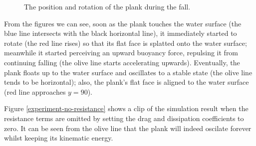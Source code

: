 \begin{figure}[h]
	\centering
	\caption{The position and rotation of the plank during the fall.}
	\label{simulation-result}
\end{figure}

From the figures we can see, soon as the plank touches the water surface (the blue line intersects with the black horizontal line), it immediately started to rotate (the red line rises) so that its flat face is splatted onto the water surface;
meanwhile it started perceiving an upward buoyancy force, repulsing it from continuing falling (the olive line starts accelerating upwards).
Eventually, the plank floats up to the water surface and oscillates to a stable state (the olive line tends to be horizontal);
also, the plank's flat face is aligned to the water surface (red line approaches $y=90$).

Figure \ref{experiment-no-resistance} shows a clip of the simulation result when the resistance terms are omitted by setting the drag and  dissipation coefficients to zero.
It can be seen from the olive line that the plank will indeed oscilate forever whilst keeping its kinematic energy.

